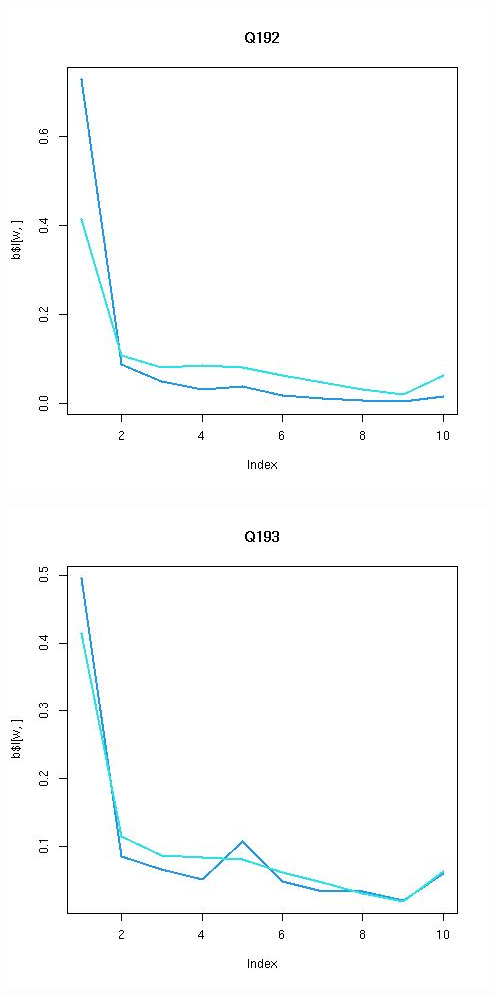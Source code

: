 \documentclass{amsart}
\begin{document}
\includegraphics[scale=0.6]{fitQ192.jpeg}

\includegraphics[scale=0.6]{fitQ193.jpeg}
\end{document}
